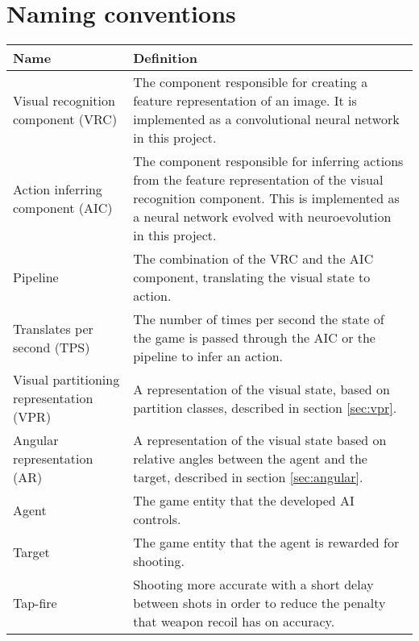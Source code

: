 
\section{Naming conventions}

\begin{table}[H]
\begin{center}

\begin{tabularx}{\textwidth}{ | p{5cm} | X |}
		\hline
	
		\textbf{Name} & \textbf{Definition} \\ \hline
		Visual recognition component (VRC) & The component responsible for creating a feature representation of an image. It is implemented as a convolutional neural network in this project. \\ \hline
		Action inferring component (AIC) & The component responsible for inferring actions from the feature representation of the visual recognition component. This is implemented as a neural network evolved with neuroevolution in this project. \\ \hline
		
		Pipeline & The combination of the VRC and the AIC component, translating the visual state to action. \\ \hline
		
Translates per second (TPS) & The number of times per second the state of the game is passed through the AIC or the pipeline to infer an action.\\ \hline		
		
		Visual partitioning representation (VPR) & A representation of the visual state, based on partition classes, described in section \ref{sec:vpr}. \\ \hline
		
		Angular representation (AR) & A representation of the visual state based on relative angles between the agent and the target, described in section \ref{sec:angular}. \\ \hline
		Agent & The game entity that the developed AI controls. \\ \hline
		Target & The game entity that the agent is rewarded for shooting. \\ \hline
		
		Tap-fire & Shooting more accurate with a short delay between shots in order to reduce the penalty that weapon recoil has on accuracy. \\ \hline
		
		
\end{tabularx}
\end{center}
\label{tab:naming-conventions} 
\end{table}

\newpage